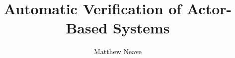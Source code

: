 \documentclass[a4paper, twoside]{report}
\title{Automatic Verification of Actor-Based Systems}
\author{Matthew Neave}
\begin{document}




\tableofcontents
\listoffigures
\lstlistoflistings

% 









% 

% 
% 

\end{document}

